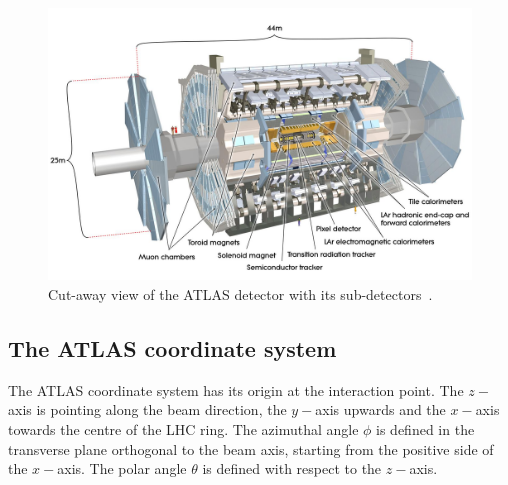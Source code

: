 \begin{figure}[tp]
     \begin{center}

            \includegraphics[width=\textwidth]{figure/ATLAS.jpeg}

    \end{center}
    \caption{Cut-away view of the ATLAS detector with its sub-detectors~\cite{ATLASDetector}.}



   \label{fig:atlas}
\end{figure}


\subsection{The ATLAS coordinate system}
The ATLAS coordinate system has its origin at the interaction point. The $z-$axis is pointing along the beam direction,
the $y-$axis  upwards and the $x-$axis towards the centre of the LHC ring. The azimuthal angle $\phi$ is defined in the transverse plane orthogonal
to the beam axis, starting from the positive side of the $x-$axis. The polar angle $\theta$ is  defined with respect to the $z-$axis.

